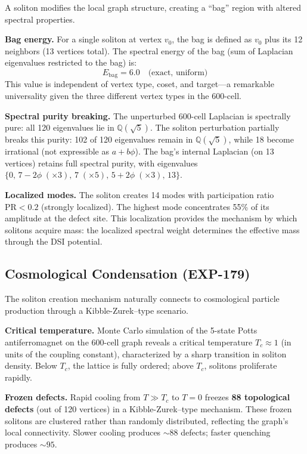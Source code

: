 \documentclass[12pt,a4paper]{article}
\begin{document}
A soliton modifies the local graph structure, creating a ``bag'' region with altered spectral properties.

\textbf{Bag energy.} For a single soliton at vertex $v_0$, the bag is defined as $v_0$ plus its 12 neighbors (13 vertices total). The spectral energy of the bag (sum of Laplacian eigenvalues restricted to the bag) is:
\begin{equation}
\boxed{E_{\text{bag}} = 6.0 \quad \text{(exact, uniform)}}
\end{equation}
This value is independent of vertex type, coset, and target---a remarkable universality given the three different vertex types in the 600-cell.

\textbf{Spectral purity breaking.} The unperturbed 600-cell Laplacian is spectrally pure: all 120 eigenvalues lie in $\mathbb{Q}(\sqrt{5})$. The soliton perturbation partially breaks this purity: 102 of 120 eigenvalues remain in $\mathbb{Q}(\sqrt{5})$, while 18 become irrational (not expressible as $a + b\phi$). The bag's internal Laplacian (on 13 vertices) retains full spectral purity, with eigenvalues $\{0,\, 7-2\phi\;(\times 3),\, 7\;(\times 5),\, 5+2\phi\;(\times 3),\, 13\}$.

\textbf{Localized modes.} The soliton creates 14 modes with participation ratio $\text{PR} < 0.2$ (strongly localized). The highest mode concentrates 55\% of its amplitude at the defect site. This localization provides the mechanism by which solitons acquire mass: the localized spectral weight determines the effective mass through the DSI potential.

\subsection{Cosmological Condensation (EXP-179)}
\label{sec:condensation}

The soliton creation mechanism naturally connects to cosmological particle production through a Kibble-Zurek--type scenario.

\textbf{Critical temperature.} Monte Carlo simulation of the 5-state Potts antiferromagnet on the 600-cell graph reveals a critical temperature $T_c \approx 1$ (in units of the coupling constant), characterized by a sharp transition in soliton density. Below $T_c$, the lattice is fully ordered; above $T_c$, solitons proliferate rapidly.

\textbf{Frozen defects.} Rapid cooling from $T \gg T_c$ to $T = 0$ freezes \textbf{88 topological defects} (out of 120 vertices) in a Kibble-Zurek--type mechanism. These frozen solitons are clustered rather than randomly distributed, reflecting the graph's local connectivity. Slower cooling produces $\sim 88$ defects; faster quenching produces $\sim 95$.
\end{document}
